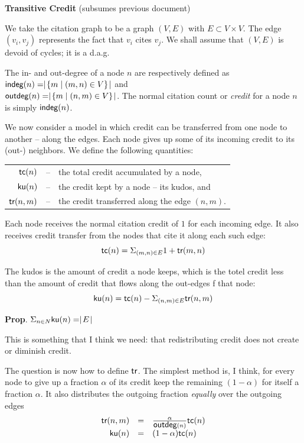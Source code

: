 \documentclass{article}
\newcommand{\outdeg}{\mbox{\sf outdeg}}
\newcommand{\indeg}{\mbox{\sf indeg}}
\newcommand{\card}[1]{\mid\!#1\!\mid}
\newcommand{\tc}{\mbox{\sf tc}}
\newcommand{\tr}{\mbox{\sf tr}}
\newcommand{\ku}{\mbox{\sf ku}}
\begin{document}
{\bf Transitive Credit}  (subsumes previous document)

We take the citation graph to be a graph $(V,E)$ with $E\subset
V\times V$.  The edge $(v_i,v_j)$ represents the fact that $v_i$ cites
$v_j$.  We shall assume that $(V,E)$ is devoid of cycles; it is a
d.a.g.

The in- and out-degree of a node $n$ are respectively defined as
$\indeg(n) = \card{\{m \mid (m,n) \in V\}}$ and\\
$\outdeg(n) = \card{\{m \mid (n,m) \in V\}}$.  The normal citation
count or {\em credit} for a node $n$ is simply $\indeg(n)$. 

We now consider a model in which credit can be transferred from one
node to another -- along the edges. Each node gives up some of its
incoming credit to its (out-) neighbors.   We define the following
quantities:

\begin{tabular}{rcl}
  $\tc(n)$ & -- &  the total credit accumulated by a node,\\
  $\ku(n)$ & -- & the credit kept by a node -- its kudos, and\\
  $\tr(n,m)$ & -- &  the credit transferred along the edge $(n,m)$.
\end{tabular}

Each node receives the normal citation credit of $1$ for each incoming edge.
It also receives credit transfer from the nodes that cite it along
each such edge:
$$\tc(n) = \Sigma_{(m,n)\in E} 1+\tr(m,n)$$

The kudos is the amount of credit a node keeps, which is the totel
credit less than the amount of credit that flows along the out-edges f
that node:
$$\ku(n) = \tc(n)  - \Sigma_{(n,m)\in E} \tr(n,m)$$

{\bf Prop}. $\Sigma_{n\in N} \ku(n) = \card{E}$

This is something that I think we need: that redistributing credit
does not create or diminish credit.

The question is now how to define $\tr$.  The simplest method is, I
think, for every node to give up a fraction $\alpha$ of its credit
keep the remaining $(1-\alpha)$ for itself a fraction $\alpha$. It also
distributes the outgoing fraction {\em equally} over the outgoing edges
\[
\begin{array}{rcl}
  \tr(n,m) &  = & \frac{\alpha}{\outdeg(n)}\tc(n)\\
  \ku(n) & = & (1-\alpha)\tc(n)
\end{array}
\]
\end{document}
